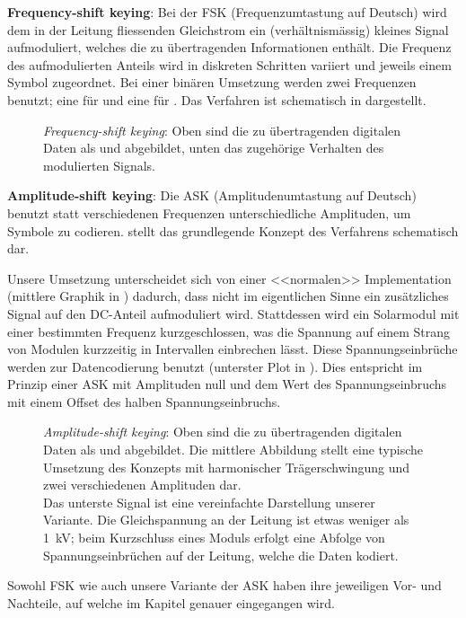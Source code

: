 \textbf{Frequency-shift keying}: Bei  der FSK (Frequenzumtastung  auf Deutsch)
wird  dem in  der Leitung  fliessenden Gleichstrom  ein (verh\"altnism\"assig)
kleines  Signal aufmoduliert,  welches  die  zu \"ubertragenden  Informationen
enth\"alt. Die  Frequenz   des  aufmodulierten   Anteils  wird   in  diskreten
Schritten variiert  und jeweils  einem Symbol zugeordnet. Bei  einer bin\"aren
Umsetzung  werden  zwei  Frequenzen  benutzt; eine  f\"ur    und  eine
f\"ur  .   Das  Verfahren ist  schematisch  in  
dargestellt.

\begin{figure}[h!tb]
    \centering
    
    \caption{%
        \emph{Frequency-shift  keying}: Oben   sind  die   zu  \"ubertragenden
        digitalen  Daten  als    und   abgebildet,  unten  das
        zugeh\"orige Verhalten des  modulierten Signals.%
    }
    \label{fig:fsk:concept}
\end{figure}


\textbf{Amplitude-shift  keying}: Die  ASK (Amplitudenumtastung  auf  Deutsch)
benutzt statt verschiedenen Frequenzen unterschiedliche Amplituden, um Symbole
zu  codieren.    stellt  das  grundlegende  Konzept  des
Verfahrens schematisch dar.

Unsere  Umsetzung unterscheidet  sich  von  einer <<normalen>>   Implementation
(mittlere   Graphik  in   )  dadurch,   dass  nicht   im
eigentlichen Sinne  ein zus\"atzliches  Signal auf den  DC-Anteil aufmoduliert
wird. Stattdessen   wird  ein   Solarmodul  mit   einer  bestimmten   Frequenz
kurzgeschlossen,  was die  Spannung auf  einem Strang  von Modulen  kurzzeitig
in  Intervallen  einbrechen  l\"asst. Diese  Spannungseinbr\"uche  werden  zur
Datencodierung  benutzt   (unterster  Plot   in  ). Dies
entspricht  im  Prinzip  einer  ASK  mit Amplituden  null  und  dem  Wert  des
Spannungseinbruchs mit einem Offset des halben Spannungseinbruchs.


\begin{figure}[h!tb]
    \centering
    
    \caption{%
        \emph{Amplitude-shift  keying}: Oben   sind  die   zu  \"ubertragenden
        digitalen  Daten als   und   abgebildet. Die  mittlere
        Abbildung stellt eine typische Umsetzung des Konzepts mit harmonischer
        Tr\"agerschwingung und zwei verschiedenen Amplituden dar.\protect\\
        Das  unterste   Signal  ist  eine  vereinfachte   Darstellung  unserer
        Variante.  Die  Gleichspannung an  der Leitung  ist etwas  weniger als
        \SI{1}{\kilo\volt}; beim Kurzschluss eines Moduls erfolgt eine Abfolge
        von Spannungseinbr\"uchen auf der Leitung, welche die Daten kodiert.%
    }
    \label{fig:ask:concept}
\end{figure}


Sowohl  FSK wie  auch  unsere  Variante der  ASK  haben  ihre jeweiligen  Vor-
und  Nachteile,  auf  welche im  Kapitel  \emph{}  genauer
eingegangen wird.
